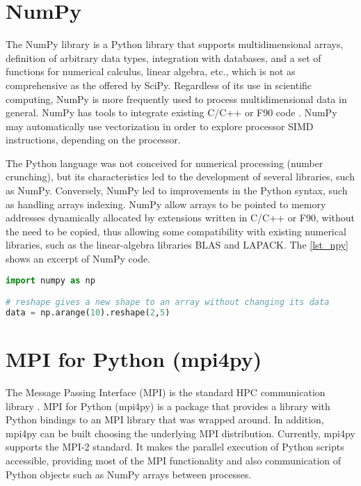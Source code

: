 %
%
%
\section{NumPy}
\label{sec_apprnump}

The NumPy library is a Python library that supports multidimensional arrays, definition of arbitrary data types, integration with databases, and a set of functions for numerical calculus, linear algebra, etc., which is not as comprehensive as the offered by SciPy. Regardless of its use in scientific computing, NumPy is more frequently used to process multidimensional data in general. NumPy has tools to integrate existing C/C++ or F90 code \cite {Walt2011}. NumPy may automatically use vectorization in order to explore processor SIMD instructions,
depending on the processor.

The Python language was not conceived for numerical processing (number crunching), but its characteristics led to the development of several libraries, such as NumPy. Conversely, NumPy led to improvements in the Python syntax, such as handling arrays indexing. NumPy allow arrays to be pointed to memory addresses dynamically allocated by extensions written in C/C++ or F90, without the need to be copied, thus allowing some compatibility with existing numerical libraries, such as the linear-algebra libraries BLAS and LAPACK. The \autoref {lst_npy} shows an excerpt of NumPy code.

\begin{lstlisting}[float=htb, language={Python}, label={lst_npy}, caption={Excerpt of NumPy code.}]
import numpy as np

# reshape gives a new shape to an array without changing its data
data = np.arange(10).reshape(2,5)
\end{lstlisting}

%
%
%
\section{MPI for Python (mpi4py)}
\label{sec_apprmpyt}

The Message Passing Interface (MPI) is the standard HPC communication library \cite {Gropp1996a, OpenMPI2020, Dongarra1995}. MPI for Python (mpi4py) \cite {Dalcin2008} is a package that provides a library with Python bindings to an MPI library that was wrapped around. In addition, mpi4py can be built choosing the underlying MPI distribution. Currently, mpi4py supports the MPI-2 standard. It makes the parallel execution of Python scripts accessible, providing most of the MPI functionality and also communication of Python objects such as NumPy arrays between processes.

